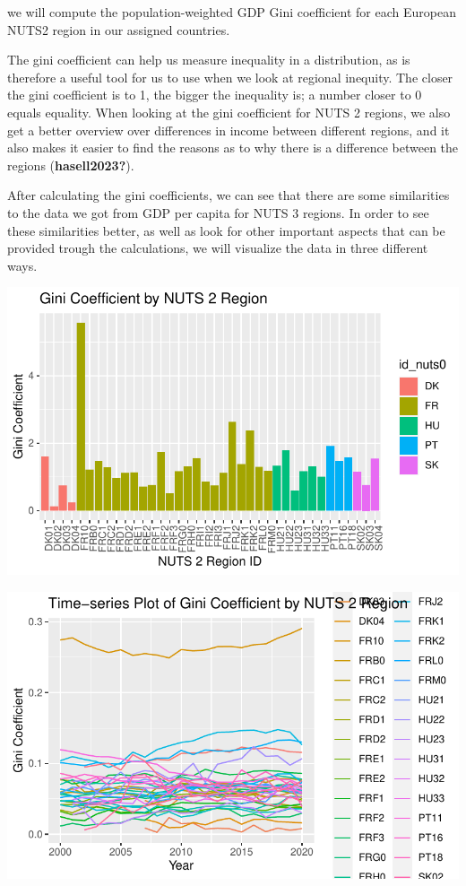 \documentclass[
  a4paper,
  DIV=11,
  numbers=noendperiod]{scrartcl}
\begin{document}
we will compute the population-weighted GDP Gini coefficient for each
European NUTS2 region in our assigned countries.

The gini coefficient can help us measure inequality in a distribution,
as is therefore a useful tool for us to use when we look at regional
inequity. The closer the gini coefficient is to 1, the bigger the
inequality is; a number closer to 0 equals equality. When looking at the
gini coefficient for NUTS 2 regions, we also get a better overview over
differences in income between different regions, and it also makes it
easier to find the reasons as to why there is a difference between the
regions (\textbf{hasell2023?}).

After calculating the gini coefficients, we can see that there are some
similarities to the data we got from GDP per capita for NUTS 3 regions.
In order to see these similarities better, as well as look for other
important aspects that can be provided trough the calculations, we will
visualize the data in three different ways.

\includegraphics{MSB104_GR_1_Final_Assignment_research_article_files/figure-pdf/unnamed-chunk-23-1.pdf}

\includegraphics{MSB104_GR_1_Final_Assignment_research_article_files/figure-pdf/unnamed-chunk-24-1.pdf}
\end{document}
